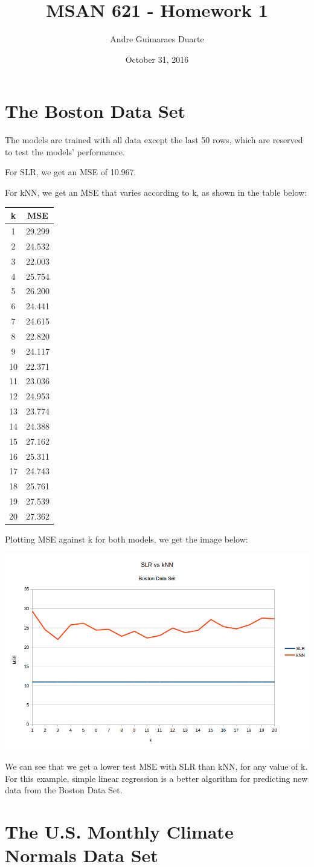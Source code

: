 \documentclass[]{article}
\title{MSAN 621 - Homework 1}
\author{Andre Guimaraes Duarte}
\date{October 31, 2016}
\begin{document}
\maketitle

\section{The Boston Data Set}

The models are trained with all data except the last 50 rows, which are reserved to test the models' performance.

For SLR, we get an MSE of 10.967.

For kNN, we get an MSE that varies according to k, as shown in the table below:

\begin{tabular}{c|c}
k & MSE\\
\hline
1 & 29.299\\
2 & 24.532\\
3 & 22.003\\
4 & 25.754\\
5 & 26.200\\
6 & 24.441\\
7 & 24.615\\
8 & 22.820\\
9 & 24.117\\
10 & 22.371\\
11 & 23.036\\
12 & 24.953\\
13 & 23.774\\
14 & 24.388\\
15 & 27.162\\
16 & 25.311\\
17 & 24.743\\
18 & 25.761\\
19 & 27.539\\
20 & 27.362\\
\end{tabular}

Plotting MSE against k for both models, we get the image below:

\includegraphics[width=\linewidth]{boston.png}

We can see that we get a lower test MSE with SLR than kNN, for any value of k. For this example, simple linear regression is a better algorithm for predicting new data from the Boston Data Set.

\section{The U.S. Monthly Climate Normals Data Set}
\end{document}
